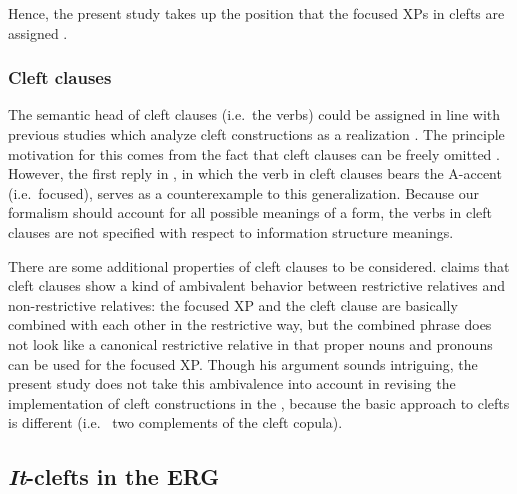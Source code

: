 \noindent Hence, the present study takes up the position that the
focused XPs in clefts are assigned .



\subsubsection{Cleft clauses}
\label{10:sssec:clefts:cleft}


The semantic head of cleft clauses (i.e.\ the verbs) could be assigned
 in line with previous studies which analyze cleft
constructions as a  realization
\citep{paggio:09}. The principle motivation for this
comes from the fact that cleft clauses can be freely omitted
\citep{kim:12a}. However, the first reply in
, in which the verb in cleft
clauses bears the A-accent (i.e.\ focused), serves as a counterexample
to this generalization. Because our formalism should
account for all possible meanings of a form, the verbs in cleft
clauses are not specified with respect to information structure
meanings.



There are some additional properties of cleft clauses to be
considered.  \citet{kim:12a} claims that cleft clauses show a kind of
ambivalent behavior between restrictive relatives and non-restrictive
relatives: the focused XP and the cleft clause are basically combined
with each other in the restrictive way, but the
combined phrase does not look like a canonical restrictive relative in
that proper nouns and pronouns can be used for the focused XP.  Though
his argument sounds intriguing, the present study does not take this
ambivalence into account in revising the implementation of cleft
constructions in the , because the basic approach to clefts
is different (i.e.\  \vs two complements of the cleft
copula).




\subsection{\textit{It}-clefts in the ERG}
\label{10:sec:it-cleft}


